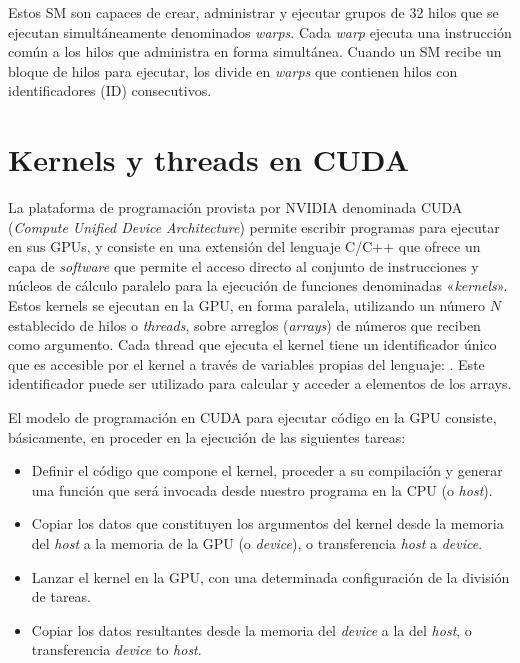 Estos SM son capaces de crear, administrar y ejecutar grupos de 32 hilos que se ejecutan simultáneamente denominados \textit{warps}. Cada \textit{warp} ejecuta una instrucción común a los hilos que administra en forma simultánea. Cuando un SM recibe un bloque de hilos para ejecutar, los divide en \textit{warps} que contienen hilos con identificadores (ID) consecutivos.

\section{Kernels y threads en CUDA}

La plataforma de programación provista por NVIDIA denominada CUDA (\textit{Compute Unified Device Architecture}) permite escribir programas para ejecutar en sus GPUs, y consiste en una extensión del lenguaje C/C++ que ofrece un capa de \textit{software} que permite el acceso directo al conjunto de instrucciones y núcleos de cálculo paralelo para la ejecución de funciones denominadas «\textit{kernels}». Estos kernels se ejecutan en la GPU, en forma paralela, utilizando un número $N$ establecido de hilos o \textit{threads}, sobre arreglos (\textit{arrays}) de números que reciben como argumento. Cada thread que ejecuta el kernel tiene un identificador único que es accesible por el kernel a través de variables propias del lenguaje: . Este identificador puede ser utilizado para calcular y acceder a elementos de los arrays.

El modelo de programación en CUDA para ejecutar código en la GPU consiste, básicamente, en proceder en la ejecución de las siguientes tareas:
\begin{itemize}
    \item Definir el código que compone el kernel, proceder a su compilación y generar una función que será invocada desde nuestro programa en la CPU (o \textit{host}).
    \item Copiar los datos que constituyen los argumentos del kernel desde la memoria del \textit{host} a la memoria de la GPU (o \textit{device}), o transferencia \textit{host} a \textit{device}.
    \item Lanzar el kernel en la GPU, con una determinada configuración de la división de tareas.
    \item Copiar los datos resultantes desde la memoria del \textit{device} a la del \textit{host}, o transferencia \textit{device} to \textit{host}.

\end{itemize}

